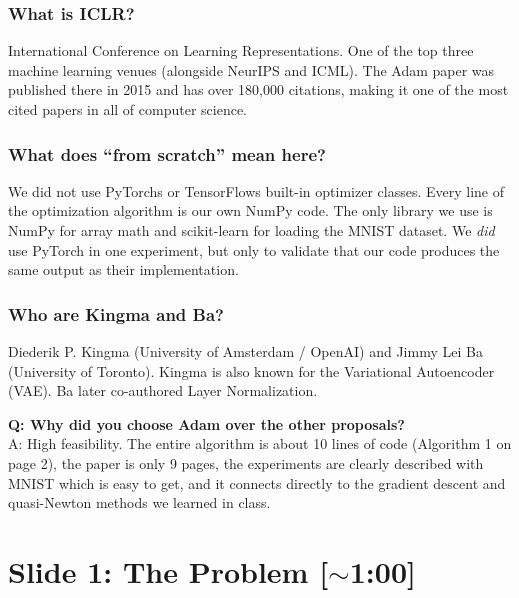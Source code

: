 \documentclass[11pt, letterpaper]{article}
\begin{document}
\begin{deepdive}
\subsubsection{What is ICLR?}
International Conference on Learning Representations. One of the top three machine learning venues (alongside NeurIPS and ICML). The Adam paper was published there in 2015 and has over 180,000 citations, making it one of the most cited papers in all of computer science.

\subsubsection{What does ``from scratch'' mean here?}
We did not use PyTorchs or TensorFlows built-in optimizer classes. Every line of the optimization algorithm is our own NumPy code. The only library we use is NumPy for array math and scikit-learn for loading the MNIST dataset. We \textit{did} use PyTorch in one experiment, but only to validate that our code produces the same output as their implementation.

\subsubsection{Who are Kingma and Ba?}
Diederik P. Kingma (University of Amsterdam / OpenAI) and Jimmy Lei Ba (University of Toronto). Kingma is also known for the Variational Autoencoder (VAE). Ba later co-authored Layer Normalization.
\end{deepdive}

\begin{qabox}
\textbf{Q: Why did you choose Adam over the other proposals?}\\
A: High feasibility. The entire algorithm is about 10 lines of code (Algorithm 1 on page 2), the paper is only 9 pages, the experiments are clearly described with MNIST which is easy to get, and it connects directly to the gradient descent and quasi-Newton methods we learned in class.
\end{qabox}


\section{Slide 1: The Problem \textnormal{\color{muted}[$\sim$1:00]}}
\end{document}
